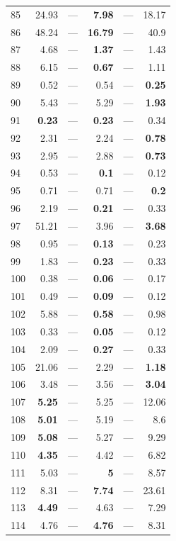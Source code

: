 \begin{longtable}{lr@{\hskip 4pt}l@{\hskip 12pt}r@{\hskip 4pt}l@{\hskip 12pt}r}
85 & 24.93 & --- & \textbf{7.98} & --- & 18.17 \\
86 & 48.24 & --- & \textbf{16.79} & --- & 40.9 \\
87 & 4.68 & --- & \textbf{1.37} & --- & 1.43 \\
88 & 6.15 & --- & \textbf{0.67} & --- & 1.11 \\
89 & 0.52 & --- & 0.54 & --- & \textbf{0.25} \\
90 & 5.43 & --- & 5.29 & --- & \textbf{1.93} \\
91 & \textbf{0.23} & --- & \textbf{0.23} & --- & 0.34 \\
92 & 2.31 & --- & 2.24 & --- & \textbf{0.78} \\
93 & 2.95 & --- & 2.88 & --- & \textbf{0.73} \\
94 & 0.53 & --- & \textbf{0.1} & --- & 0.12 \\
95 & 0.71 & --- & 0.71 & --- & \textbf{0.2} \\
96 & 2.19 & --- & \textbf{0.21} & --- & 0.33 \\
97 & 51.21 & --- & 3.96 & --- & \textbf{3.68} \\
98 & 0.95 & --- & \textbf{0.13} & --- & 0.23 \\
99 & 1.83 & --- & \textbf{0.23} & --- & 0.33 \\
100 & 0.38 & --- & \textbf{0.06} & --- & 0.17 \\
101 & 0.49 & --- & \textbf{0.09} & --- & 0.12 \\
102 & 5.88 & --- & \textbf{0.58} & --- & 0.98 \\
103 & 0.33 & --- & \textbf{0.05} & --- & 0.12 \\
104 & 2.09 & --- & \textbf{0.27} & --- & 0.33 \\
105 & 21.06 & --- & 2.29 & --- & \textbf{1.18} \\
106 & 3.48 & --- & 3.56 & --- & \textbf{3.04} \\
107 & \textbf{5.25} & --- & 5.25 & --- & 12.06 \\
108 & \textbf{5.01} & --- & 5.19 & --- & 8.6 \\
109 & \textbf{5.08} & --- & 5.27 & --- & 9.29 \\
110 & \textbf{4.35} & --- & 4.42 & --- & 6.82 \\
111 & 5.03 & --- & \textbf{5} & --- & 8.57 \\
112 & 8.31 & --- & \textbf{7.74} & --- & 23.61 \\
113 & \textbf{4.49} & --- & 4.63 & --- & 7.29 \\
114 & 4.76 & --- & \textbf{4.76} & --- & 8.31 \\

\end{longtable}

